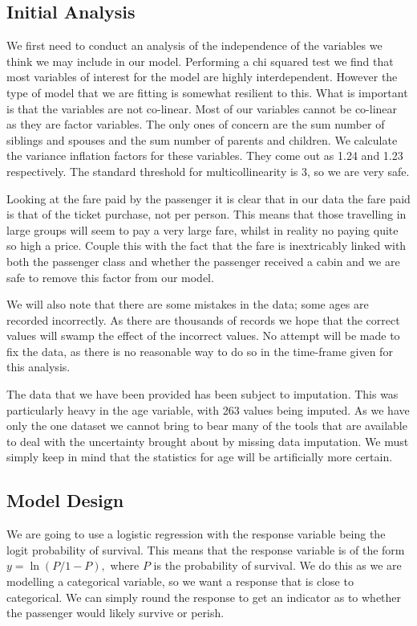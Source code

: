 \documentclass[]{extarticle}
\begin{document}
\subsection{Initial Analysis}

We first need to conduct an analysis of the independence of the variables we think we may include in our model. Performing a chi squared test we find that most variables of interest for the model are highly interdependent. However the type of model that we are fitting is somewhat resilient to this. What is important is that the variables are not co-linear. Most of our variables cannot be co-linear as they are factor variables. The only ones of concern are the sum number of siblings and spouses and the sum number of parents and children. We calculate the variance inflation factors for these variables. They come out as 1.24 and 1.23 respectively. The standard threshold for multicollinearity is 3, so we are very safe.

Looking at the fare paid by the passenger it is clear that in our data the fare paid is that of the ticket purchase, not per person. This means that those travelling in large groups will seem to pay a very large fare, whilst in reality no paying quite so high a price. Couple this with the fact that the fare is inextricably linked with both the passenger class and whether the passenger received a cabin and we are safe to remove this factor from our model. 

We will also note that there are some mistakes in the data; some ages are recorded incorrectly. As there are thousands of records we hope that the correct values will swamp the effect of the incorrect values. No attempt will be made to fix the data, as there is no reasonable way to do so in the time-frame given for this analysis.

The data that we have been provided has been subject to imputation. This was particularly heavy in the age variable, with 263 values being imputed. As we have only the one dataset we cannot bring to bear many of the tools that are available to deal with the uncertainty brought about by missing data imputation. We must simply keep in mind that the statistics for age will be artificially more certain.

\subsection{Model Design}

We are going to use a logistic regression with the response variable being the logit probability of survival. This means that the response variable is of the form $y = \ln(P/1-P),$ where $P$ is the probability of survival. We do this as we are modelling a categorical variable, so we want a response that is close to categorical. We can simply round the response to get an indicator as to whether the passenger would likely survive or perish.
\end{document}

